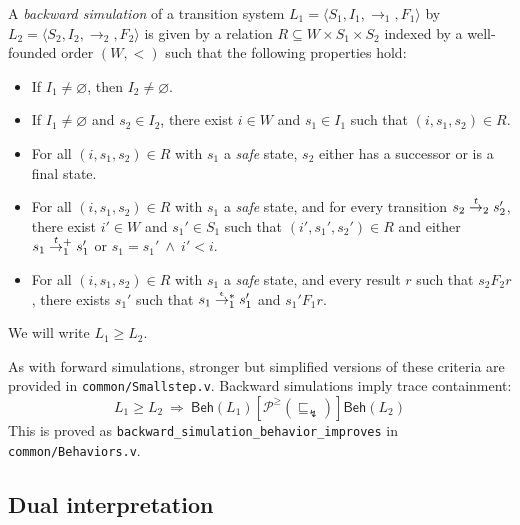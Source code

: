 \documentclass[sigplan,10pt,review,anonymous]{acmart}
\newcommand{\kw}[1]{\ensuremath{\mathsf{#1}}}
\newcommand{\refby}{\sqsubseteq}
\newcommand{\ifr}[1]{\mathrel{[{#1}]}}
\begin{document}
\begin{definition} %
A \emph{backward simulation}
of a transition system
$L_1 = \langle S_1, I_1, {\rightarrow}_1, F_1 \rangle$
by
$L_2 = \langle S_2, I_2, {\rightarrow}_2, F_2 \rangle$
is given by a relation $R \subseteq W \times S_1 \times S_2$
indexed by a well-founded order $(W, {<})$
such that the following properties hold:
\begin{itemize}
  \item If $I_1 \ne \varnothing$, then $I_2 \ne \varnothing$.
  \item If $I_1 \ne \varnothing$ and $s_2 \in I_2$,
    there exist $i \in W$ and $s_1 \in I_1$
    such that $(i, s_1, s_2) \in R$.
  \item For all $(i, s_1, s_2) \in R$
    with $s_1$ a \emph{safe} state,
    $s_2$ either has a successor or
    is a final state.
  \item For all $(i, s_1, s_2) \in R$
    with $s_1$ a \emph{safe} state,
    and for every transition
    $s_2 \mathrel{\smash{\stackrel{t}{\rightarrow}}_2} s_2'$,
    there exist $i' \in W$ and $s_1' \in S_1$
    such that $(i', s_1', s_2') \in R$ and either
    $s_1 \mathrel{\smash{\stackrel{t}{\rightarrow}}_1^+} s_1'$ or
    $s_1 = s_1' \:\wedge\: i' < i$.
  \item For all $(i, s_1, s_2) \in R$
    with $s_1$ a \emph{safe} state,
    and every result $r$ such that $s_2 \mathrel{F_2} r$,
    there exists $s_1'$ such that
    $s_1 \mathrel{\smash{\stackrel{\epsilon}{\rightarrow}}_1^*} s_1'$ and
    $s_1' \mathrel{F_1} r$.
\end{itemize}
We will write $L_1 \ge L_2$.
\end{definition}

As with forward simulations,
stronger but simplified versions
of these criteria
are provided in \texttt{common/Smallstep.v}.
Backward simulations imply trace containment:
\[
  L_1 \ge L_2
  \: \Rightarrow \:
  \kw{Beh}(L_1) \ifr{\mathcal{P}^\ge(\refby_\lightning)} \kw{Beh}(L_2)
\]
This is proved as \texttt{backward\_simulation\_behavior\_improves}
in \texttt{common/Behaviors.v}.


\subsection{Dual interpretation} %
\end{document}
